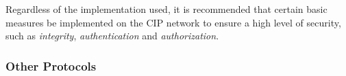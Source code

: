 \bigskip
Regardless of the implementation used, it is recommended that certain basic measures be implemented on the CIP network to ensure a high level of security, such as \textit{integrity}, \textit{authentication} and \textit{authorization}.

\subsubsection{Other Protocols}

\vfill
\nolinenumbers


